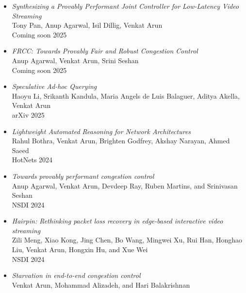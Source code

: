 \documentclass[notitlepage]{article}
\newcommand{\heading}[1]{\vspace{1em}{\large \MakeUppercase{\textrm{#1}}}

  \hrulefill
}
\begin{document}
\heading{Publications}

\begin{itemize}[noitemsep,nolistsep]
        \item {\it Synthesizing a Provably Performant Joint Controller for Low-Latency Video Streaming}\label{paper:syntra}\\
      Tony Pan, Anup Agarwal, Isil Dillig, Venkat Arun\\
      Coming soon 2025\\
              \item {\it FRCC: Towards Provably Fair and Robust Congestion Control}\label{paper:frcc}\\
      Anup Agarwal, Venkat Arun, Srini Seshan\\
      Coming soon 2025\\
              \item {\it Speculative Ad-hoc Querying}\label{paper:speql}\\
      Haoyu Li, Srikanth Kandula, Maria Angels de Luis Balaguer, Aditya Akella, Venkat Arun\\
      arXiv 2025\\
              \item {\it Lightweight Automated Reasoning for Network Architectures}\label{paper:archie}\\
      Rahul Bothra, Venkat Arun, Brighten Godfrey, Akshay Narayan, Ahmed Saeed\\
      HotNets 2024\\
              \item {\it Towards provably performant congestion control}\label{paper:ccmatic}\\
      Anup Agarwal, Venkat Arun, Devdeep Ray, Ruben Martins, and Srinivasan Seshan\\
      NSDI 2024\\
              \item {\it Hairpin: Rethinking packet loss recovery in edge-based interactive video streaming}\label{paper:hairpin}\\
      Zili Meng, Xiao Kong, Jing Chen, Bo Wang, Mingwei Xu, Rui Han, Honghao Liu, Venkat Arun, Hongxin Hu, and Xue Wei\\
      NSDI 2024\\
              \item {\it Starvation in end-to-end congestion control}\label{paper:starvation}\\
      Venkat Arun, Mohammad Alizadeh, and Hari Balakrishnan\\

\end{itemize}
\end{document}
